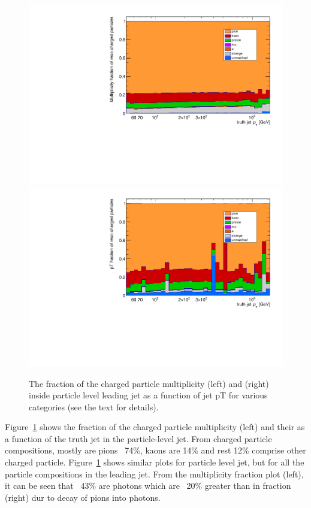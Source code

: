 \begin{figure}
\centering
\includegraphics[scale=0.3, page=2]{figures/jet_comp_study_powheg_Tight_MultiplicityFraction.pdf}
\hspace{2mm}
\includegraphics[scale=0.3, page=2]{figures/jet_comp_study_powheg_Tight_pTFraction.pdf}
\caption {The fraction of the charged particle multiplicity (left) and \pT (right) inside particle level leading jet as a function of jet pT for various categories (see the text for details).}
\label{fig:fraction of charged particles in truth jet}
\end{figure}

Figure~\ref{fig:fraction of charged particles in truth jet} shows the fraction of the charged particle multiplicity (left) and their \pT  as a function of the truth jet \pT in the particle-level jet. From charged particle compositions, mostly are pions ~74\%, kaons are 14\% and rest 12\% comprise other charged particle.
Figure~\ref{fig:fraction of charged particles in truth jet} shows similar plots for particle level jet, but for all the particle compositions in the leading jet. From the multiplicity fraction plot (left), it can be seen that ~43\% are photons which are ~20\% greater than in \pt fraction (right) dur to decay of pions into photons.


